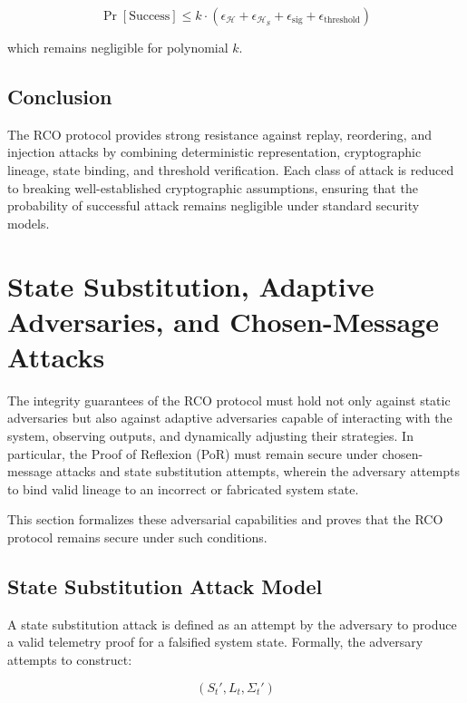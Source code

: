 \begin{equation}
\Pr[\text{Success}] \leq k \cdot (\epsilon_{\mathcal{H}} + \epsilon_{\mathcal{H}_S} + \epsilon_{\text{sig}} + \epsilon_{\text{threshold}})
\end{equation}

which remains negligible for polynomial $k$.

\subsection{Conclusion}

The RCO protocol provides strong resistance against replay, reordering, and injection attacks by combining deterministic representation, cryptographic lineage, state binding, and threshold verification. Each class of attack is reduced to breaking well-established cryptographic assumptions, ensuring that the probability of successful attack remains negligible under standard security models.

\section{State Substitution, Adaptive Adversaries, and Chosen-Message Attacks}

The integrity guarantees of the RCO protocol must hold not only against static adversaries but also against adaptive adversaries capable of interacting with the system, observing outputs, and dynamically adjusting their strategies. In particular, the Proof of Reflexion (PoR) must remain secure under chosen-message attacks and state substitution attempts, wherein the adversary attempts to bind valid lineage to an incorrect or fabricated system state.

This section formalizes these adversarial capabilities and proves that the RCO protocol remains secure under such conditions.

\subsection{State Substitution Attack Model}

A state substitution attack is defined as an attempt by the adversary to produce a valid telemetry proof for a falsified system state. Formally, the adversary attempts to construct:

\begin{equation}
(S_t', L_t, \Sigma_t')
\end{equation}


